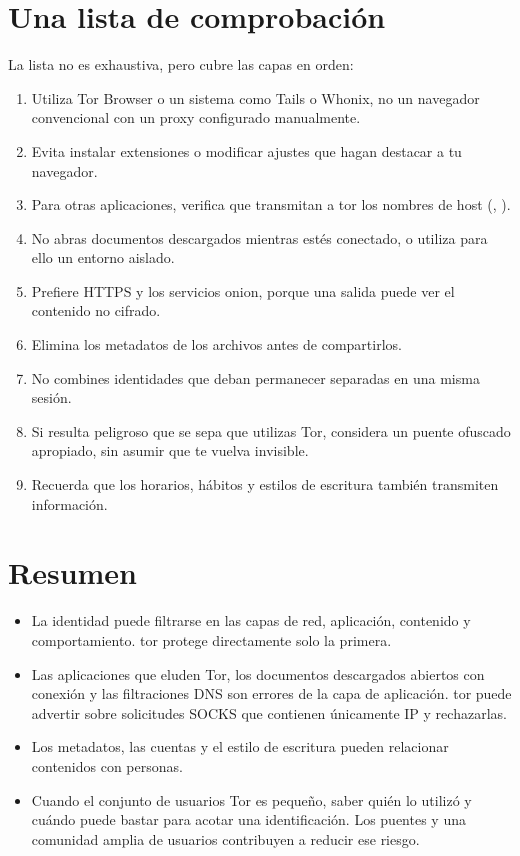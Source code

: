 \section{Una lista de comprobación}\label{sec:opsec-lista}

La lista no es exhaustiva, pero cubre las capas en orden:
\begin{enumerate}
  \item Utiliza Tor Browser o un sistema como Tails o Whonix, no un navegador convencional con un proxy configurado manualmente.
  \item Evita instalar extensiones o modificar ajustes que hagan destacar a tu navegador.
  \item Para otras aplicaciones, verifica que transmitan a tor los nombres de host (, ).
  \item No abras documentos descargados mientras estés conectado, o utiliza para ello un entorno aislado.
  \item Prefiere HTTPS y los servicios onion, porque una salida puede ver el contenido no cifrado.
  \item Elimina los metadatos de los archivos antes de compartirlos.
  \item No combines identidades que deban permanecer separadas en una misma sesión.
  \item Si resulta peligroso que se sepa que utilizas Tor, considera un puente ofuscado apropiado, sin asumir que te vuelva invisible.
  \item Recuerda que los horarios, hábitos y estilos de escritura también transmiten información.
\end{enumerate}

\section*{Resumen}
\begin{itemize}
  \item La identidad puede filtrarse en las capas de red, aplicación, contenido y comportamiento. tor protege directamente solo la primera.
  \item Las aplicaciones que eluden Tor, los documentos descargados abiertos con conexión y las filtraciones DNS son errores de la capa de aplicación. tor puede advertir sobre solicitudes SOCKS que contienen únicamente IP y rechazarlas.
  \item Los metadatos, las cuentas y el estilo de escritura pueden relacionar contenidos con personas.
  \item Cuando el conjunto de usuarios Tor es pequeño, saber quién lo utilizó y cuándo puede bastar para acotar una identificación. Los puentes y una comunidad amplia de usuarios contribuyen a reducir ese riesgo.
\end{itemize}

